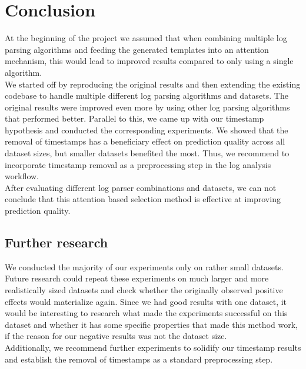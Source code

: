 
\chapter{Conclusion}
\label{ch:Conclusion}
At the beginning of the project we assumed that when combining multiple log parsing algorithms and feeding the generated templates into an attention mechanism, this would lead to improved results compared to only using a single algorithm. \\

We started off by reproducing the original results and then extending the existing codebase to handle multiple different log parsing algorithms and datasets. The original results were improved even more by using other log parsing algorithms that performed better. Parallel to this, we came up with our timestamp hypothesis and conducted the corresponding experiments. We showed that the removal of timestamps has a beneficiary effect on prediction quality across all dataset sizes, but smaller datasets benefited the most.  Thus, we recommend to incorporate timestamp removal as a preprocessing step in the log analysis workflow. \\

After evaluating different log parser combinations and datasets, we can not conclude that this attention based selection method is effective at improving prediction quality. 


\section{Further research}
We conducted the majority of our experiments only on rather small datasets. Future research could repeat these experiments on much larger and more realistically sized datasets and check whether the originally observed positive effects would materialize again. Since we had good results with one dataset, it would be interesting to research what made the experiments successful on this dataset and whether it has some specific properties that made this method work, if the reason for our negative results was not the dataset size. \\

Additionally, we recommend further experiments to solidify our timestamp results and establish the removal of timestamps as a standard preprocessing step. 